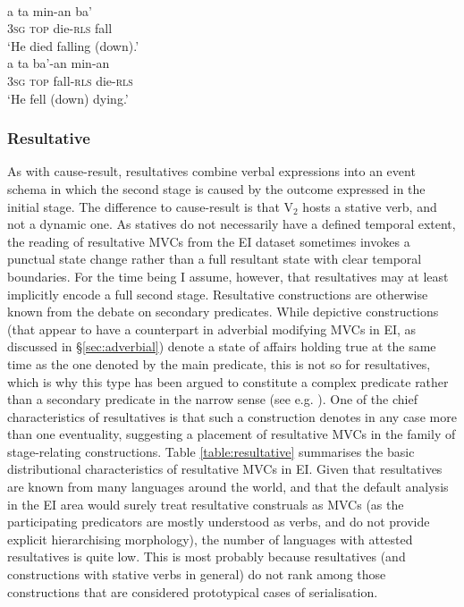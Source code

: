 \ea
{}\\
\ea \label{Teiwa_1}
\gll a ta min-an ba' \\
3\textsc{sg} \textsc{top} die-\textsc{rls} fall \\
\glft `He died falling (down).' \\ 
\ex \label{Teiwa_2}
\gll a ta ba'-an min-an \\ 
3\textsc{sg} \textsc{top} fall-\textsc{rls} die-\textsc{rls} \\
\glft `He fell (down) dying.'\\ 
\z
\z

\subsubsection{Resultative} \label{sec:resultative}

As with cause-result, resultatives combine verbal expressions into an event schema in which the second stage is caused by the outcome expressed in the initial stage. The difference to cause-result is that V$_2$ hosts a stative verb, and not a dynamic one. As statives do not necessarily have a defined temporal extent, the reading of resultative MVCs from the EI dataset sometimes invokes a punctual state change rather than a full resultant state with clear temporal boundaries. For the time being I assume, however, that resultatives may at least implicitly encode a full second stage. Resultative constructions are otherwise known from
the debate on secondary predicates. While depictive constructions (that appear to have a counterpart in adverbial modifying MVCs in EI, as discussed in §\ref{sec:adverbial}) denote a state of affairs holding true at the same time as the one denoted by the main predicate, this is not so for resultatives, which is why this type has been argued to constitute a complex predicate rather than a secondary predicate in the narrow sense (see e.g. \citealt[66]{schultze2004depictive}). One of the chief characteristics of resultatives is that such a construction denotes in any case more than one eventuality, suggesting a placement of resultative MVCs in the family of stage-relating constructions. Table \ref{table:resultative} summarises the basic distributional characteristics of resultative MVCs in EI. Given that resultatives are known from many languages around the world, and that the default analysis in the EI area would surely treat resultative construals as MVCs (as the participating predicators are mostly understood as verbs, and do not provide explicit hierarchising morphology), the number of languages with attested resultatives is quite low. This is most probably because resultatives (and constructions with stative verbs in general) do not rank among those constructions that are considered prototypical cases of serialisation.

